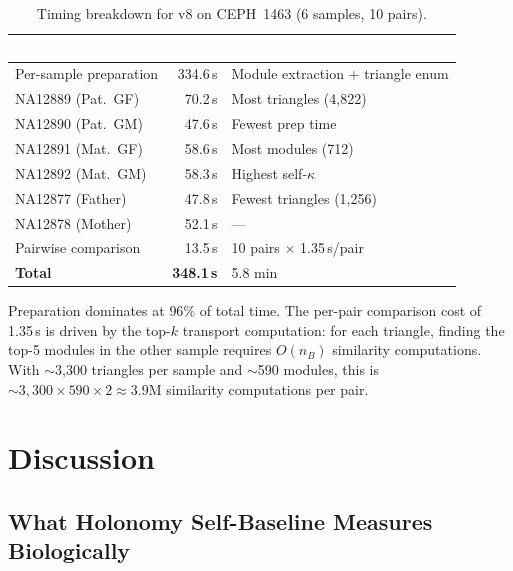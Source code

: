 \documentclass{../yalumba}
\begin{document}
\begin{table}[H]
  \centering
  \tablestyle
  \caption{Timing breakdown for v8 on CEPH~1463 (6 samples, 10 pairs).}
  \label{tab:timing}
  \begin{tabular}{lrl}
    \toprule
    \rowcolor{table-header}
    \textcolor{white}{\textbf{Phase}} &
    \textcolor{white}{\textbf{Time}} &
    \textcolor{white}{\textbf{Notes}} \\
    \midrule
    Per-sample preparation & 334.6\,s & Module extraction + triangle enum \\
    \quad NA12889 (Pat.~GF) & 70.2\,s & Most triangles (4{,}822) \\
    \quad NA12890 (Pat.~GM) & 47.6\,s & Fewest prep time \\
    \quad NA12891 (Mat.~GF) & 58.6\,s & Most modules (712) \\
    \quad NA12892 (Mat.~GM) & 58.3\,s & Highest self-$\kappa$ \\
    \quad NA12877 (Father)  & 47.8\,s & Fewest triangles (1{,}256) \\
    \quad NA12878 (Mother)  & 52.1\,s & --- \\
    \midrule
    Pairwise comparison & 13.5\,s & 10 pairs $\times$ 1.35\,s/pair \\
    \midrule
    \textbf{Total} & \textbf{348.1\,s} & 5.8 min \\
    \bottomrule
  \end{tabular}
\end{table}

Preparation dominates at $96\%$ of total time.  The per-pair comparison
cost of 1.35\,s is driven by the top-$k$ transport computation: for each
triangle, finding the top-5 modules in the other sample requires $O(n_B)$
similarity computations.  With $\sim$3{,}300 triangles per sample and
$\sim$590 modules, this is $\sim 3{,}300 \times 590 \times 2 \approx
3.9\text{M}$ similarity computations per pair.


\section{Discussion}
\label{sec:discussion}

\subsection{What Holonomy Self-Baseline Measures Biologically}
\end{document}
